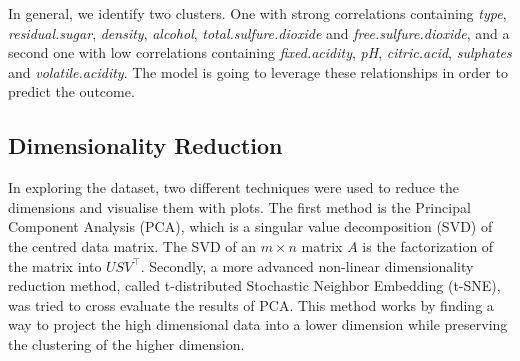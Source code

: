 \documentclass[11pt,twoside]{article}
\numberwithin{Theorem}{section}
\numberwithin{Definition}{section}
\numberwithin{Lemma}{section}
\numberwithin{Algorithm}{section}
\numberwithin{equation}{section}
\begin{document}
In general, we identify two clusters. One with strong correlations containing \textit{type}, \textit{residual.sugar}, \textit{density}, \textit{alcohol}, \textit{total.sulfure.dioxide} and \textit{free.sulfure.dioxide}, and a second one with low correlations containing \textit{fixed.acidity}, \textit{pH}, \textit{citric.acid}, \textit{sulphates} and \textit{volatile.acidity}. The model is going to leverage these relationships in order to predict the outcome.
\subsection{Dimensionality Reduction}
\label{sec:reduction}
In exploring the dataset, two different techniques were used to reduce the dimensions and visualise them with plots. The first method is the Principal Component Analysis (PCA), which is a singular value decomposition (SVD) of the centred data matrix. The SVD of an $ m \times n $ matrix $A$ is the factorization of the matrix into $USV^\top$. Secondly, a more advanced non-linear dimensionality reduction method, called t-distributed Stochastic Neighbor Embedding (t-SNE), was tried to cross evaluate the results of PCA. This method works by finding a way to project the high dimensional data into a lower dimension while preserving the clustering of the higher dimension.
\end{document}

